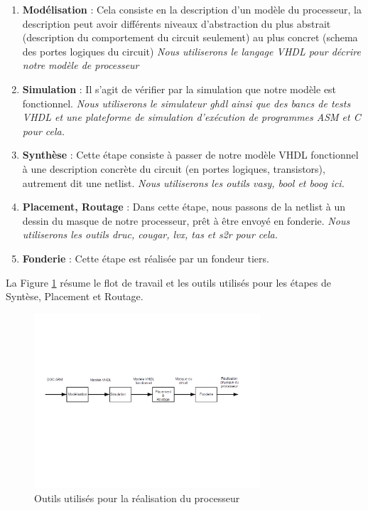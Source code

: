\documentclass{article}
\begin{document}
\begin{enumerate}
\item \textbf{Modélisation}  : Cela consiste en la description d'un modèle du processeur,
                      la description peut avoir différents niveaux d'abstraction
                      du plus abstrait (description du comportement du circuit seulement)
                      au plus concret (schema des portes logiques du circuit)
                      \textit{Nous utiliserons le langage VHDL pour décrire notre modèle de processeur}
\item \textbf{Simulation}    : Il s'agit de vérifier par la simulation que notre modèle est fonctionnel. 
                      \textit{Nous utiliserons le simulateur ghdl ainsi que des bancs de tests VHDL
                      et une plateforme de simulation d'exécution de programmes ASM et C pour cela.}
\item \textbf{Synthèse} : Cette étape consiste à passer de notre modèle VHDL fonctionnel à une description
                          concrète du circuit (en portes logiques, transistors), autrement dit une netlist.
                          \textit{Nous utiliserons les outils vasy, bool et boog ici.}
\item \textbf{Placement, Routage} : Dans cette étape, nous passons de la netlist à un
                          dessin du masque de notre processeur, prêt à être envoyé en fonderie.
                          \textit{Nous utiliserons les outils druc, cougar, lvx, tas et s2r pour cela.}
\item \textbf{Fonderie} :          Cette étape est réalisée par un fondeur tiers.
\end{enumerate}

La Figure \ref{outils} résume le flot de travail et les outils utilisés pour les étapes de Syntèse,
Placement et Routage.

\begin{figure}[H]
\includegraphics[width=0.75\textwidth]{pics/conception.png}
\centering
\caption{Outils utilisés pour la réalisation du processeur}
\label{outils}
\end{figure}
\end{document}
